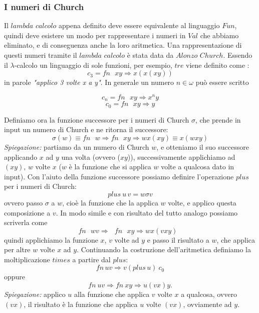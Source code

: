 \documentclass{article}
\theoremstyle{definition}
\theoremstyle{definition}
\theoremstyle{definition}
\theoremstyle{remark}
\begin{document}
    \subsubsection{I numeri di Church}
    Il $lambda$ $calcolo$ appena definito deve essere equivalente al linguaggio $Fun$, quindi deve esistere un modo
    per rappresentare i numeri in $Val$ che abbiamo eliminato, e di conseguenza anche la loro aritmetica.
    Una rappresentazione di questi numeri tramite il $lambda$ $calcolo$ è stata data da $Alonzo$ $Church$. Essendo
    il $\lambda$-calcolo un linguaggio di sole funzioni, per esempio, $tre$ viene definito come :
    $$c_3 = fn\text{ $xy\Rightarrow x(x(xy))$}$$
    in parole \textit{"applico 3 volte x a y"}. In generale un numero $n\in \omega$ può essere scritto

    $$c_n = fn\text{ $xy$}\Rightarrow x^n y$$
    $$c_0 = fn\text{ $xy$}\Rightarrow  y$$

    Definiamo ora la funzione successore per i numeri di Church $\sigma$, che prende in input un numero di Church e ne ritorna il successore:
    $$\sigma(w) \equiv fn\text{ }w\Rightarrow fn\text{ }xy \Rightarrow wx(xy)\equiv x(wxy)$$
    \textit{Spiegazione:} partiamo da un numero di Church $w$, e otteniamo il suo successore applicando $x$ ad $y$ una volta (ovvero ($xy$)),  successivamente applichiamo ad $(xy)$, $w$ volte $x$ ($w$ è la funzione che si applica $w$ volte a qualcosa dato in input).
    Con l'aiuto della funzione successore possiamo definire l'operazione $plus$ per i numeri di Church:
    $$plus\:u\,v = w \sigma v$$
    ovvero passo $\sigma$ a $w$, cioè la funzione che la applica $w$ volte, e applico questa composizione a $v$. In modo simile e con risultato del tutto analogo
    possiamo scriverla come
    $$fn \text{ $wv\Rightarrow$ $fn$ $xy\Rightarrow wx(vxy)$ }$$
    quindi applichiamo la funzione $x$, $v$ volte ad $y$ e passo il risultato a $w$, che applica per altre $w$ volte $x$ ad $y$.
    Continuando la costruzione dell'aritmetica definiamo la moltiplicazione $times$ a partire dal $plus$:
    $$fn\, uv\Rightarrow v(plus\, u)\:c_0$$
    oppure
    $$fn\: uv\Rightarrow fn\: xy\Rightarrow u(vx)y.$$
    \textit{Spiegazione:} applico $u$ alla funzione che applica $v$ volte  $x$ a qualcosa, ovvero $(vx)$, il risultato è la funzione che applica $u$ volte  $(vx)$, ovviamente ad $y$.
\end{document}
